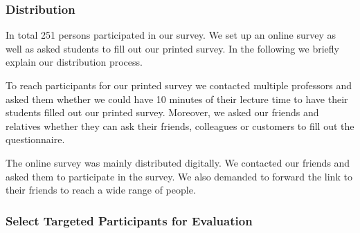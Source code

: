 \subsubsection{Distribution}
In total 251 persons participated in our survey.
 We set up an online survey as well as asked students to fill out our printed survey.
 In the following we briefly explain our distribution process.


\begin{description}[leftmargin=0cm]
	\item[Printed Survey:] To reach participants for our printed survey we contacted multiple professors and asked them whether we could have 10 minutes of their lecture time to have their students filled out our printed survey.
 Moreover, we asked our friends and relatives whether they can ask their friends, colleagues or customers to fill out the questionnaire.

	\item[Online Survey:] The online survey was mainly distributed digitally.
 We contacted our friends and asked them to participate in the survey.
 We also demanded to forward the link to their friends to reach a wide range of people.

\end{description}

\subsubsection{Select Targeted Participants for Evaluation}


